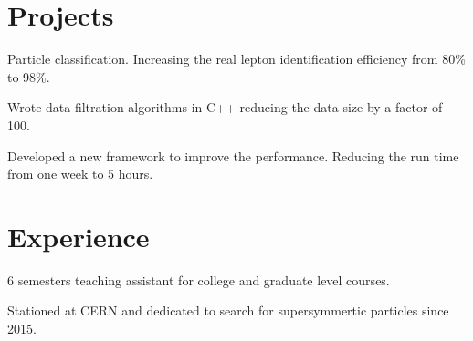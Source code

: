 \documentclass[letterpaper]{deedy-resume-openfont}
\begin{document}
\section{Projects}



\location{}
\begin{tightemize}
\item Particle classification. Increasing the real lepton identification efficiency from 80\% to 98\%.
\item Wrote data filtration algorithms in C++ reducing the data size by a factor of 100.
\item Developed a new framework to improve the performance. Reducing the run time from one week to 5 hours.
\end{tightemize}
\sectionsep


\section{Experience}

\begin{tightemize}
\item 6 semesters teaching assistant for college and graduate level courses.
\item Stationed at CERN and dedicated to search for supersymmertic particles since 2015.
\end{tightemize}
\sectionsep
\end{document}
